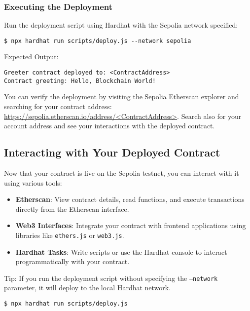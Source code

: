 \documentclass[12pt]{article}
\begin{document}
\subsubsection{Executing the Deployment}

Run the deployment script using Hardhat with the Sepolia network specified:

\begin{verbatim}
$ npx hardhat run scripts/deploy.js --network sepolia
\end{verbatim}
Expected Output:
\begin{verbatim}
Greeter contract deployed to: <ContractAddress>
Contract greeting: Hello, Blockchain World!
\end{verbatim}
You can verify the deployment by visiting the Sepolia Etherscan explorer and searching for your contract address: \url{https://sepolia.etherscan.io/address/<ContractAddress>}. Search also for your account address and see your interactions with the deployed contract.

\subsection{Interacting with Your Deployed Contract}

Now that your contract is live on the Sepolia testnet, you can interact with it using various tools:

\begin{itemize}
    \item \textbf{Etherscan}: View contract details, read functions, and execute transactions directly from the Etherscan interface.
    
    \item \textbf{Web3 Interfaces}: Integrate your contract with frontend applications using libraries like \texttt{ethers.js} or \texttt{web3.js}.
    
    \item \textbf{Hardhat Tasks}: Write scripts or use the Hardhat console to interact programmatically with your contract.
\end{itemize}
Tip: If you run the deployment script without specifying the \texttt{--network} parameter, it will deploy to the local Hardhat network.
\begin{verbatim}
$ npx hardhat run scripts/deploy.js
\end{verbatim}
\end{document}
